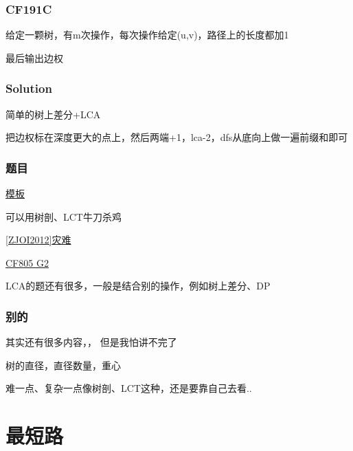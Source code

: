 \documentclass{beamer}
\begin{document}
  \begin{frame}
    \frametitle{CF191C}

    给定一颗树，有m次操作，每次操作给定(u,v)，路径上的长度都加1

    \vspace*{1\baselineskip}

    最后输出边权
  \end{frame}

  \begin{frame}
    \frametitle{Solution}
    简单的树上差分+LCA

    \vspace*{1\baselineskip}

    把边权标在深度更大的点上，然后两端+1，lca-2，dfs从底向上做一遍前缀和即可
  \end{frame}

  \begin{frame}
    \frametitle{题目}

    \href{https://www.luogu.com.cn/problem/P3379}{模板}

    可以用树剖、LCT牛刀杀鸡

    \vspace*{1\baselineskip}
    
    \href{https://www.luogu.com.cn/problem/P2597}{[ZJOI2012]灾难}
    
    \vspace*{1\baselineskip}
    
    \href{https://codeforces.com/contest/1702/problem/G2}{CF805 G2}

    \vspace*{1\baselineskip}

    LCA的题还有很多，一般是结合别的操作，例如树上差分、DP
  \end{frame}

  \begin{frame}
    \frametitle{别的}
    其实还有很多内容，， 但是我怕讲不完了

    \vspace*{1\baselineskip}
    
    树的直径，直径数量，重心
    
    \vspace*{1\baselineskip}

    难一点、复杂一点像树剖、LCT这种，还是要靠自己去看..
  \end{frame}

  \section{最短路}
\end{document}
